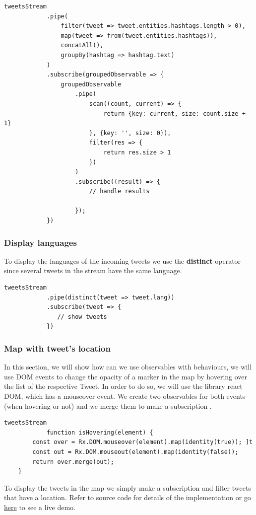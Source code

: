 \documentclass[12pt]{report}
\begin{document}
\begin{verbatim}
tweetsStream
            .pipe(
                filter(tweet => tweet.entities.hashtags.length > 0),
                map(tweet => from(tweet.entities.hashtags)),
                concatAll(), 
                groupBy(hashtag => hashtag.text)
            )
            .subscribe(groupedObservable => {
                groupedObservable
                    .pipe(
                        scan((count, current) => {
                            return {key: current, size: count.size + 1}
                        }, {key: '', size: 0}),
                        filter(res => {
                            return res.size > 1
                        })
                    )
                    .subscribe((result) => {
                        // handle results

                    });
            })
\end{verbatim}
\subsubsection{Display languages}
To display the languages of the incoming tweets we use the \textbf{distinct} operator since several tweets in the stream have the same language.
\begin{verbatim}
tweetsStream
            .pipe(distinct(tweet => tweet.lang))
            .subscribe(tweet => {
               // show tweets
            })
\end{verbatim}
\subsubsection{Map with tweet's location}
In this section, we will show how can we use observables with behaviours, we will use DOM events to change the opacity of a marker in the map by hovering over the list of the respective Tweet. In order to do so, we will use the library react DOM, which has a mouseover event. We create two observables for both events (when hovering or not) and we merge them to make a subscription \cite{mansilla2018reactive}. 
\begin{verbatim}
tweetsStream
            function isHovering(element) {
        const over = Rx.DOM.mouseover(element).map(identity(true)); ]t
        const out = Rx.DOM.mouseout(element).map(identity(false)); 
        return over.merge(out); 
    }
\end{verbatim}
To display the tweets in the map we simply make a subscription and filter tweets that have a location. Refer to source code for details of the implementation or go \href{https://fast-bayou-22628.herokuapp.com}{here} to see a live demo.
\end{document}
